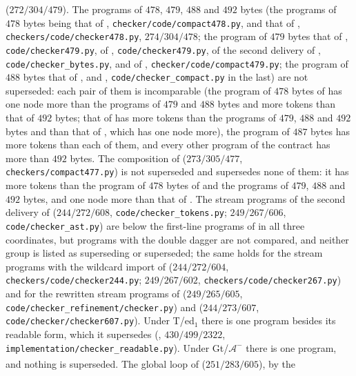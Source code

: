 ($272/304/479$). The programs of $478$, $479$, $488$ and $492$ bytes (the
programs of $478$ bytes being that of ,
\texttt{checker/code/compact478.py}, and that of ,
\texttt{checkers/code/checker478.py}, $274/304/478$; the program of $479$ bytes that of
, \texttt{code/checker479.py}, of
, \texttt{code/checker479.py}, of the second delivery of
, \texttt{code/checker\_bytes.py}, and of
, \texttt{checker/code/compact479.py}; the program of
$488$ bytes that of ,  and
, \texttt{code/checker\_compact.py} in the last) are not
superseded: each pair of them is incomparable (the program of $478$ bytes of
 has one node more than the programs of $479$ and $488$
bytes and more tokens than that of $492$ bytes; that of 
has more tokens than the programs of $479$, $488$ and $492$ bytes and than
that of , which has one node more), the program of $487$
bytes has more tokens than each of them, and every other program of the
contract has more than $492$ bytes. The composition of 
($273/305/477$, \texttt{checkers/compact477.py}) is not superseded and
supersedes none of them: it has more tokens than the program of $478$ bytes of
 and the programs of $479$, $488$ and $492$ bytes, and one
node more than that of .
The stream programs of the second delivery of 
($244/272/608$, \texttt{code/checker\_tokens.py}; $249/267/606$,
\texttt{code/checker\_ast.py}) are below the first-line programs of
 in all three coordinates, but programs with the double
dagger are not compared, and neither group is listed as superseding or
superseded; the same holds for the stream programs with the wildcard import
of  ($244/272/604$, \texttt{checkers/code/checker244.py};
$249/267/602$, \texttt{checkers/code/checker267.py}) and for the rewritten
stream programs of  ($249/265/605$,
\texttt{code/checker\_refinement/checker.py}) and 
($244/273/607$, \texttt{code/checker/checker607.py}). Under T/ed$_1$ there is
one program besides its readable form, which it supersedes
(, $430/499/2322$, \texttt{implementation/checker\_readable.py}).
Under Gt/$\mathcal A^{-}$ there is one program, and nothing is superseded.
The global loop of
 ($251/283/605$\textsuperscript{\dag}), by the
